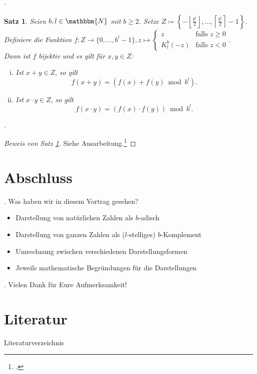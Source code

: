 \documentclass{beamer}
\newcommand{\N}{\mathbbm{N}} %
\newtheorem{satz}{Satz}[section]
\newcommand{\secframe}{\begin{frame}{\insertsectionnumber. \insertsection}}
\newcommand{\subsecframe}{\begin{frame}{\insertsectionnumber.\insertsubsectionnumber \ \insertsubsection}}
\begin{document}
        \subsecframe
            \begin{satz}\label{satz:Rechnen_b-Komplementdarstellung}
                Seien $b,l \in \N$ mit $b \geq 2$. Setze $Z \coloneq \left\{ - \left\lfloor \displaystyle\frac{b^l}{2} \right\rfloor , \dots, \left\lceil \displaystyle\frac{b^l}{2} \right\rceil -1 \right\}$.
                Definiere die Funktion $f \colon Z \to \{0, \dots, b^l-1\}, z \mapsto 
                \begin{cases}
                    z &\text{falls } z \geq 0 \\
                    K_l^b(-z) &\text{falls } z <0
                \end{cases}$. \\
                Dann ist $f$ bijektiv und es gilt für $x,y\in Z$:
                \begin{enumerate}[i)] 
                \item Ist $x+y \in Z$, so gilt 
                    \[f(x+y) = (f(x) + f(y) \bmod b^l).\] \label{satz:Rechnen-Komplementdarstellung_Addition}
                \item Ist $x \cdot y \in Z$, so gilt 
                    \[f(x \cdot y) = (f(x) \cdot f(y)) \bmod b^l.\] \label{satz:Rechnen-Komplementdarstellung_Multiplikation}
                \end{enumerate}
            \end{satz}
        \end{frame}

        \subsecframe
            \begin{proof}[Beweis von Satz \ref{satz:Rechnen_b-Komplementdarstellung}]
                Siehe Ausarbeitung.\footcite{deerberg2026}
            \end{proof}
        \end{frame}

\section{Abschluss}

    \secframe
        Was haben wir in diesem Vortrag gesehen?
        \begin{itemize}
            \item Darstellung von natürlichen Zahlen als $b$-adisch
            \item Darstellung von ganzen Zahlen als ($l$-stelliges) $b$-Komplement
            \item Umrechnung zwischen verschiedenen Darstellungsformen
            \item Jeweils mathematische Begründungen für die Darstellungen
        \end{itemize}
    \end{frame}

    \secframe
        Vielen Dank für Eure Aufmerksamkeit!
    \end{frame}


\section*{Literatur}
\begin{frame}[allowframebreaks]{Literaturverzeichnis}
    \printbibliography
\end{frame}
\end{document}
